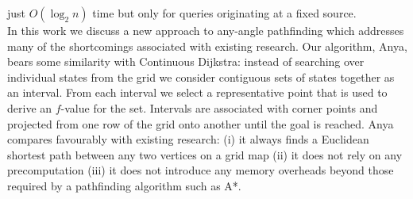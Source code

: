 just $O(\log_{2}n)$ time but only for queries originating at a fixed source.
\\
In this work we discuss a new approach to any-angle pathfinding which
addresses many of the shortcomings associated with existing research.
Our algorithm, Anya, bears some similarity with Continuous Dijkstra: 
instead of searching over individual states from the grid we consider
contiguous sets of states together as an interval. From each interval we select a 
representative point that is used to derive an $f$-value for the set.
Intervals are associated with corner points and projected from one 
row of the grid onto another until the goal is reached.
Anya compares favourably with existing research: (i)
it always finds a Euclidean shortest path between any two vertices on
a grid map (ii) it does not rely on any precomputation (iii) 
it does not introduce any memory overheads beyond those required by a 
pathfinding algorithm such as A*.

